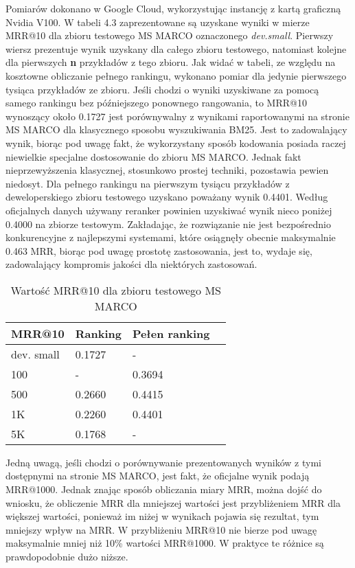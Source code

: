 Pomiarów dokonano w Google Cloud, wykorzystując instancję z kartą graficzną Nvidia V100. W tabeli 4.3 zaprezentowane są uzyskane wyniki w mierze MRR@10 dla zbioru testowego MS MARCO oznaczonego \emph{dev.small}. Pierwszy wiersz prezentuje wynik uzyskany dla całego zbioru testowego, natomiast kolejne dla pierwszych \textbf{n} przykładów z tego zbioru. Jak widać w tabeli, ze względu na kosztowne obliczanie pełnego rankingu, wykonano pomiar dla jedynie pierwszego tysiąca przykładów ze zbioru. Jeśli chodzi o wyniki uzyskiwane za pomocą samego rankingu bez późniejszego ponownego rangowania, to MRR@10 wynoszący około 0.1727 jest porównywalny z wynikami raportowanymi na stronie MS MARCO dla klasycznego sposobu wyszukiwania BM25. Jest to zadowalający wynik, biorąc pod uwagę fakt, że wykorzystany sposób kodowania posiada raczej niewielkie specjalne dostosowanie do zbioru MS MARCO. Jednak fakt nieprzewyższenia klasycznej, stosunkowo prostej techniki, pozostawia pewien niedosyt. Dla pełnego rankingu na pierwszym tysiącu przykładów z deweloperskiego zbioru testowego uzyskano poważany wynik 0.4401. Według oficjalnych danych używany reranker powinien uzyskiwać wynik nieco poniżej 0.4000 na zbiorze testowym. Zakładając, że rozwiązanie nie jest bezpośrednio konkurencyjne z najlepszymi systemami, które osiągnęły obecnie maksymalnie 0.463 MRR, biorąc pod uwagę prostotę zastosowania, jest to, wydaje się, zadowalający kompromis jakości dla niektórych zastosowań. \newline


\begin{table}[htp]
\centering
\caption{Wartość MRR@10 dla zbioru testowego MS MARCO}
\vspace*{5mm}
\begin{tabular}{llll}
\hline
 MRR@10 & Ranking & Pełen ranking & \\
 \hline
 dev. small & 0.1727 & - & \\
 100 & - & 0.3694 & \\
 500 & 0.2660 & 0.4415 \\
 1K & 0.2260 & 0.4401 \\
 5K & 0.1768 &  - \\
 \hline
\end{tabular}
\end{table}

Jedną uwagą, jeśli chodzi o porównywanie prezentowanych wyników z tymi dostępnymi na stronie MS MARCO, jest fakt, że oficjalne wynik podają MRR@1000. Jednak znając sposób obliczania miary MRR, można dojść do wniosku, że obliczenie MRR dla mniejszej wartości jest przybliżeniem MRR dla większej wartości, ponieważ im niżej w wynikach pojawia się rezultat, tym mniejszy wpływ na MRR. W przybliżeniu MRR@10 nie bierze pod uwagę maksymalnie mniej niż 10\% wartości MRR@1000. W praktyce te różnice są prawdopodobnie dużo niższe.


